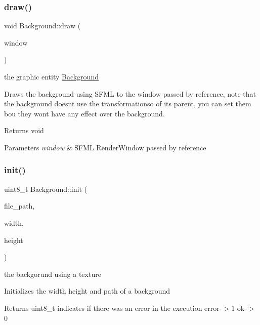 \subsubsection{\texorpdfstring{draw()}{draw()}}
{\footnotesize\ttfamily void Background\+::draw (\begin{DoxyParamCaption}\item[{sf\+::\+Render\+Window \&}]{window }\end{DoxyParamCaption})}

the graphic entity \hyperlink{class_background}{Background}

Draws the background using S\+F\+ML to the window passed by reference, note that the background doesn\textquotesingle{}t use the transformationso of it\textquotesingle{}s parent, you can set them bou they won\textquotesingle{}t have any effect over the background.

\begin{DoxyReturn}{Returns}
void 
\end{DoxyReturn}

\begin{DoxyParams}{Parameters}
{\em window} & S\+F\+ML Render\+Window passed by reference \\
\hline
\end{DoxyParams}
\mbox{\label{class_background_ae4ae960cd876ef4a2f9fb6e0a7e8bc73}} 
\subsubsection{\texorpdfstring{init()}{init()}}
{\footnotesize\ttfamily uint8\+\_\+t Background\+::init (\begin{DoxyParamCaption}\item[{const std\+::string \&}]{file\+\_\+path,  }\item[{const uint32\+\_\+t}]{width,  }\item[{const uint32\+\_\+t}]{height }\end{DoxyParamCaption})}

the backgorund using a texture

Initializes the width height and path of a background

\begin{DoxyReturn}{Returns}
uint8\+\_\+t indicates if there was an error in the execution error-\/$>$1 ok-\/$>$0 
\end{DoxyReturn}

